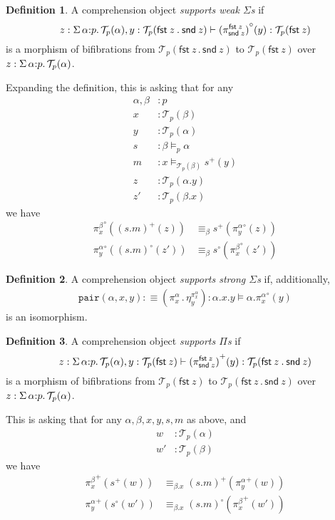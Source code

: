 \documentclass[10pt]{article}
\theoremstyle{definition}
\newtheorem{definition}{Definition}
\newcommand\dsd[1]{\ensuremath{\mathsf{#1}}}
\newcommand{\Yields}{\vDash}
\newcommand\TrPlus[2]{\ensuremath{{#1}^+(#2)}}
\newcommand\TrCirc[2]{\ensuremath{{#1}^\circ(#2)}}
\newcommand\El[2]{\mathcal{T}_{#1}(#2)}
\newcommand{\app}[2]{\ensuremath{#1 \: #2}}
\newcommand{\sigmacl}[3]{\ensuremath{\textnormal{$\Sigma$}\,#1{:}#2.\,#3}}
\newcommand{\fst}[1]{\app{\dsd{fst}}{#1}}
\newcommand{\snd}[1]{\app{\dsd{snd}}{#1}}
\newcommand\bdot[0]{\mathbin{.}}
\begin{document}
\begin{definition}
  A comprehension object \emph{supports weak $\Sigma$s} if
\[
  z:\sigmacl{\alpha}{p}{\El{p}{\alpha}}, y : \El{p}{\fst z \bdot \snd z}
  \vdash \TrCirc{(\pi^{\fst z}_{\snd{z}})}{y} : \El{p}{\fst z} 
\]
is a morphism of bifibrations from $\El{p}{\fst z \bdot \snd z}$ to $\El{p}{\fst z}$ over $z : \sigmacl{\alpha}{p}{\El{p}{\alpha}}$.
\end{definition}
Expanding the definition, this is asking that for any 
\begin{align*}
\alpha, \beta &: p \\
x &: \El{p}{\beta} \\
y &: \El{p}{\alpha} \\
s &: \beta\Yields_p \alpha \\
m &: x \Yields_{\El{p}{\beta}} \TrPlus{s}{y} \\
z &: \El{p}{\alpha.y} \\
z' &: \El{p}{\beta.x}
\end{align*}
we have
\begin{align*}
\TrCirc{\pi^{\beta}_x}{\TrPlus{(s . m)}{z}} &\equiv_\beta \TrPlus{s}{\TrCirc{\pi^{\alpha}_{y}}{z}} \\
\TrCirc{\pi^{\alpha}_y}{\TrCirc{(s . m)}{z'}} &\equiv_\beta \TrCirc{s}{\TrCirc{\pi^{\beta}_{x}}{z'}}
\end{align*}

\begin{definition}
A comprehension object \emph{supports strong $\Sigma$s} if, additionally,
\begin{align*}
\mathtt{pair}(\alpha,x,y) :\equiv (\pi^\alpha_x \bdot \eta^{\pi^\alpha_x}_y) : \alpha.x.y \vDash \alpha.\TrCirc{\pi^\alpha_x}{y}
\end{align*}
is an isomorphism.
\end{definition}

\begin{definition}
  A comprehension object \emph{supports $\Pi$s} if
\[
  z:\sigmacl{\alpha}{p}{\El{p}{\alpha}}, y : \El{p}{\fst z}
  \vdash \TrPlus{(\pi^{\fst z}_{\snd{z}})}{y} : \El{p}{\fst z \bdot \snd z} 
\]
is a morphism of bifibrations from $\El{p}{\fst z}$ to $\El{p}{\fst z \bdot \snd z}$ over $z : \sigmacl{\alpha}{p}{\El{p}{\alpha}}$.
\end{definition}
This is asking that for any $\alpha, \beta, x, y, s, m$ as above, and
\begin{align*}
w &: \El{p}{\alpha} \\
w' &: \El{p}{\beta}
\end{align*}
we have
\begin{align*}
\TrPlus{\pi^{\beta}_x}{\TrPlus{s}{w}} &\equiv_{\beta.x} \TrPlus{(s . m)}{\TrPlus{\pi^{\alpha}_{y}}{w}} \\
\TrPlus{\pi^{\alpha}_y}{\TrCirc{s}{w'}} &\equiv_{\beta.x} \TrCirc{(s . m)}{\TrPlus{\pi^{\beta}_{x}}{w'}}
\end{align*}
\end{document}
